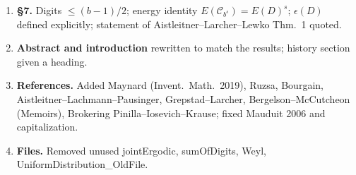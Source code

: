 \documentclass[12pt,leqno]{amsart}
\numberwithin{equation}{section}
\numberwithin{counter2}{section}
\theoremstyle{definition}
\theoremstyle{plain}
\begin{document}
\begin{enumerate}
    \item \textbf{\S7.} Digits $\leq(b-1)/2$; energy identity $E(\mathcal C_{b^s})=E(D)^s$; $\epsilon(D)$ defined explicitly; statement of Aistleitner--Larcher--Lewko Thm.~1 quoted.
    \item \textbf{Abstract and introduction} rewritten to match the results; history section given a heading.
    \item \textbf{References.} Added Maynard (Invent.\ Math.\ 2019), Ruzsa, Bourgain, Aistleitner--Lachmann--Pausinger, Grepstad--Larcher, Bergelson--McCutcheon (Memoirs), Brokering Pinilla--Iosevich--Krause; fixed Mauduit 2006 and capitalization.
    \item \textbf{Files.} Removed unused jointErgodic, sumOfDigits, Weyl, UniformDistribution\_OldFile.
\end{enumerate}



%	
%	
\end{document}
